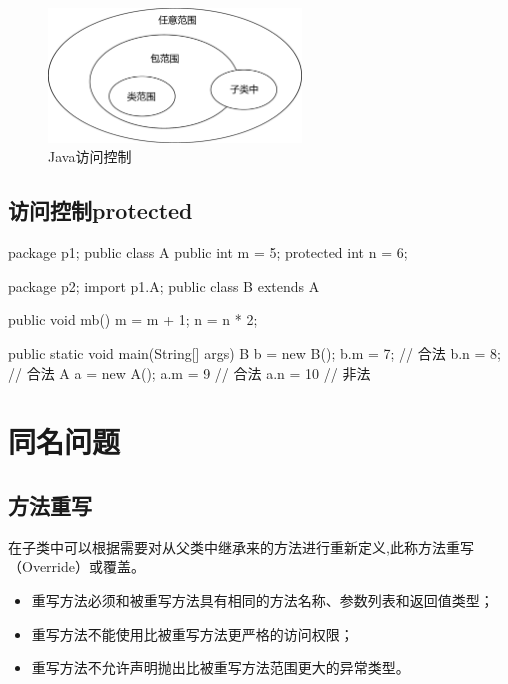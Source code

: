 \begin{figure}[htb]
\centering
\includegraphics[width=0.6\textwidth]{images/Advanced-object-oriented-programming-1/fig-java-access-control.pdf}
\caption{Java访问控制}
\label{fig:java-access-control}
\end{figure}


\subsection{访问控制protected}


\begin{javaCode}
  package p1;
  public class A {
    public int m = 5;
    protected int n = 6;
  }
\end{javaCode}

\begin{javaCode}
  package p2;
  import p1.A;
  public class B extends A {
    public void mb() {
      m = m + 1;
      n = n * 2;
    }
    
    public static void main(String[] args) {
      B b = new B();
      b.m = 7;  // 合法
      b.n = 8;   // 合法
      A a = new A();
      a.m = 9 // 合法
      a.n = 10 // 非法
    }
  }
\end{javaCode}

\section{同名问题}

\subsection{方法重写}

在子类中可以根据需要对从父类中继承来的方法进行重新定义,此称方法重写（Override）或覆盖。

\begin{itemize}
\item 重写方法必须和被重写方法具有相同的方法名称、参数列表和返回值类型；
\item 重写方法不能使用比被重写方法更严格的访问权限；
\item 重写方法不允许声明抛出比被重写方法范围更大的异常类型。
\end{itemize}

